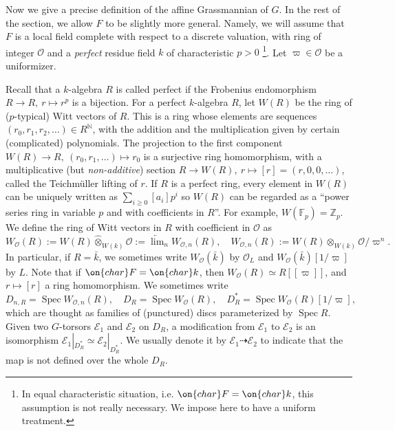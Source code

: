 \documentclass[11pt]{amsart}
\theoremstyle{definition}
\theoremstyle{definition}
\theoremstyle{definition}
\numberwithin{equation}{subsection}
\newcommand{\bF}{{\mathbb F}}
\newcommand{\bN}{{\mathbb N}}
\newcommand{\bZ}{{\mathbb Z}}
\newcommand{\mE}{{\mathcal E}}
\newcommand{\mO}{{\mathcal O}}
\newcommand{\cha}{{\on{char}}}
\DeclareMathOperator{\Spec}{Spec}
\begin{document}
Now we give a precise definition of the affine Grassmannian of $G$.  In the rest of the section, we allow $F$ to be slightly more general. Namely, we will assume that
$F$ is a local field complete with respect to a discrete valuation, with ring of integer $\mO$ and a \emph{perfect} residue field $k$ of characteristic $p>0$ \footnote{In equal characteristic situation, i.e. $\cha F=\cha k$, this assumption is not really necessary. We impose here to have a uniform treatment.}. Let $\varpi\in\mO$ be a uniformizer. 

Recall that a $k$-algebra $R$ is called perfect if the Frobenius endomorphism $R\to R, \ r\mapsto r^p$ is a bijection.
For a perfect $k$-algebra $R$, let $W(R)$ be the ring of ($p$-typical) Witt vectors of $R$. This is a ring whose elements are sequences $(r_0,r_1,r_2,\ldots)\in R^{\bN}$, with the addition and the multiplication given by certain (complicated) polynomials. The projection to the first component $W(R)\to R, \ (r_0,r_1,\ldots)\mapsto r_0$ is a surjective ring homomorphism, with a multiplicative (but \emph{non-additive}) section $R\to W(R), \ r\mapsto [r]=(r,0,0,\ldots)$, called the Teichm\"uller lifting of $r$. If $R$ is a perfect ring, every element in $W(R)$ can be uniquely written as $\sum_{i\geq 0} [a_i]p^i$ so $W(R)$ can be regarded as a ``power series ring in variable $p$ and with coefficients in $R$''.
For example, $W(\bF_p)=\bZ_p$. We define the ring of Witt vectors in $R$ with coefficient in $\mO$ as
\begin{equation}\label{ramified Witt vector}
W_\mO(R):= W(R)\hat\otimes_{W(k)}\mO:= \underleftarrow\lim_n W_{\mO,n}(R),\quad W_{\mO,n}(R):=W(R)\otimes_{W(k)} \mO/\varpi^n.
\end{equation}
In particular, if $R=\bar k$, we sometimes write $W_\mO(\bar k)$ by $\mO_L$ and $W_{\mO}(\bar k)[1/\varpi]$ by $L$.
Note that if $\cha F=\cha k$, then $W_\mO(R)\simeq R[[\varpi]]$, and $r\mapsto [r]$ a ring homomorphism. We sometimes write
\begin{equation}\label{discs}
D_{n,R}=\Spec W_{\mO,n}(R),\quad D_R=\Spec W_\mO(R),\quad D_R^*=\Spec W_\mO(R)[1/\varpi],
\end{equation}
which are thought as families of (punctured) discs parameterized by $\Spec R$.
Given two $G$-torsors $\mE_1$ and $\mE_2$ on $D_R$, a modification from $\mE_1$ to $\mE_2$ is an isomorphism $\mE_1|_{D_R^*}\simeq \mE_2|_{D_R^*}$. We usually denote it by $\mE_1\dashrightarrow\mE_2$ to indicate that the map is not defined over the whole $D_R$. 
\end{document}

